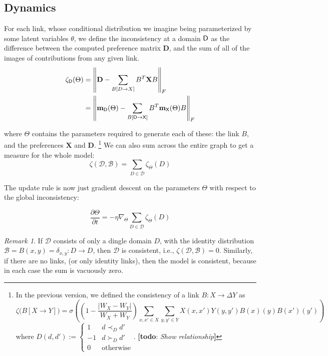 \documentclass{article}
\theoremstyle{plain}
\theoremstyle{definition}
\theoremstyle{remark}
\newtheorem*{remark}{Remark}
\newcommand{\todo}[1]{{\color{red}\large\textbf{[todo}: {\normalsize\itshape#1}\textbf{]}}}
\newcommand\mat[1]{\mathbf #1}
\newcommand\m[1]{\mathbf m_{\mathsf #1}}
\begin{document}
 	
 	
 	\subsection{Dynamics}
	
	
	
	For each link, whose conditional distribution we imagine being parameterized by some latent variables $\theta$, we define the inconsistency at a domain $\sf D$ as the difference between the computed preference matrix $\mat D$, and the sum of all of the images of contributions from any given link.
	\begin{align*}
		\zeta_{\mathsf D}(\Theta) &= \left\lVert \mat D  - \sum_{B[D \to X]} B^T \mat X B \right\rVert_F \\
			&= \left\lVert \m D(\Theta)  - \sum_{B[\sf D \to X]} B^T \m X(\Theta) B \right\rVert_F
	\end{align*}

	where $\Theta$ contains the parameters required to generate each of these: the link $B$, and the preferences $\mat X$ and $\mat D$.
 	\footnote{In the previous version, we defined the consistency of a link $B : X \to \Delta Y$ as 
 	 	\[ \zeta\big(B[X \to Y]\big) =  \sigma \left( \left(1- \frac{|W_X - W_Y|}{W_X + W_Y}\right) \sum_{x,x' \in X}\sum_{y,y' \in Y} X(x,x') Y(y,y') B(x)(y) B(x')(y') \right) \]
 		where 
 	 	$ D(d, d') := \begin{cases}
 	 		1 & d \prec_D d' \\
 	 		-1 & d \succ_D d' \\
 	 		0 & \text{otherwise}
 	 	\end{cases} $.  \todo{Show relationship}}	
 	We can also sum across the entire graph to get a measure for the whole model:
 	\[ \zeta(\mathcal D, \mathcal B) = \sum_{D \in \mathcal D} \zeta_\Theta(D) \]
 	
 	The update rule is now just gradient descent on the parameters $\Theta$ with respect to the global inconsistency:
 	
 	\[ \frac{\partial \Theta}{\partial t} = - \eta \nabla_\Theta \sum_{D \in \mathcal D} \zeta_\Theta(D) \]
 	
 	
 	\begin{remark}
 		If $\mathcal D$ consists of only a dingle domain $D$, with the identity distribution $\mathcal B = {B(x,y) = \delta_{x,y}: D \to D}$, then $\mathcal D$ is consistent, i.e., $\zeta(\mathcal D, \mathcal B) = 0$. Similarly, if there are no links, (or only identity links), then the model is consistent, because in each case the sum is vacuously zero. 
 	\end{remark}
 	
\end{document}
